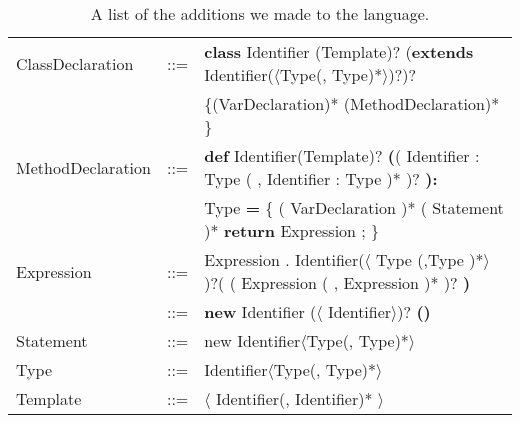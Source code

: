 \begin{table}[h]
  \caption{A list of the additions we made to the language.}
  \begin{tabular}{ l  c  l}
    \hline
    ClassDeclaration & ::= & \textbf{class} Identifier (Template)?
    (\textbf{extends} Identifier($\langle$Type(, Type)*$\rangle$)?)?  \\
    && \{(VarDeclaration)* (MethodDeclaration)* \}  \\
    \hline
    MethodDeclaration & ::= & \textbf{def} Identifier(Template)?
    \textbf{(}( Identifier : Type ( , Identifier : Type )* )? \textbf{):}\\
    &&Type \textbf{=}
    \{ ( VarDeclaration )* ( Statement )*
    \textbf{return} Expression ; \}\\
    \hline
    Expression & ::= &  Expression . Identifier($\langle$ Type (,Type )*$\rangle$ )?( ( Expression ( , Expression )* )? \textbf{)} \\
    & ::= & \textbf{new} Identifier ($\langle$ Identifier$\rangle$)? \textbf{()} \\
    \hline
    Statement & ::= & new Identifier$\langle$Type(, Type)*$\rangle$ \\
    \hline
    Type & ::= & Identifier$\langle$Type(, Type)*$\rangle$ \\
    \hline
    Template & ::= & $\langle$ Identifier(, Identifier)* $\rangle$ \\
    \hline
  \end{tabular}
\end{table}
